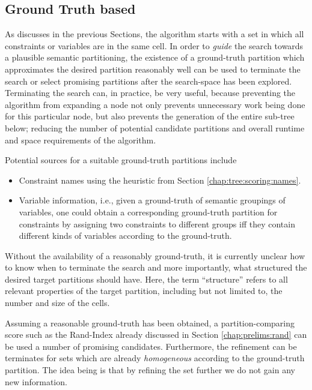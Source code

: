 			\clearpage


		\subsection{Ground Truth based}
		\label{chap:tree:scoring:groundtruth}

			As discusses in the previous Sections, the algorithm starts with a set in which all constraints or variables are in the same cell.
			In order to \textit{guide} the search towards a plausible semantic partitioning, the existence of a ground-truth partition which approximates the desired partition reasonably well can be used to terminate the search or select promising partitions after the search-space has been explored.
			Terminating the search can, in practice, be very useful, because preventing the algorithm from expanding a node not only prevents unnecessary work being done for this particular node, but also prevents the generation of the entire sub-tree below; reducing the number of potential candidate partitions and overall runtime and space requirements of the algorithm.

			Potential sources for a suitable ground-truth partitions include
			\begin{itemize}
				\item Constraint names using the heuristic from Section \ref{chap:tree:scoring:names}.
				\item Variable information, i.e., given a ground-truth of semantic groupings of variables, one could obtain a corresponding ground-truth partition for constraints by assigning two constraints to different groups iff they contain different kinds of variables according to the ground-truth.
			\end{itemize}

			Without the availability of a reasonably ground-truth, it is currently unclear how to know when to terminate the search and more importantly, what structured the desired target partitions should have.
			Here, the term \enquote{structure} refers to all relevant properties of the target partition, including but not limited to, the number and size of the cells.

			Assuming a reasonable ground-truth has been obtained, a partition-comparing score such as the Rand-Index already discussed in Section \ref{chap:prelims:rand} can be used a number of promising candidates.
			Furthermore, the refinement can be terminates for sets which are already \textit{homogeneous} according to the ground-truth partition.
			The idea being is that by refining the set further we do not gain any new information.

